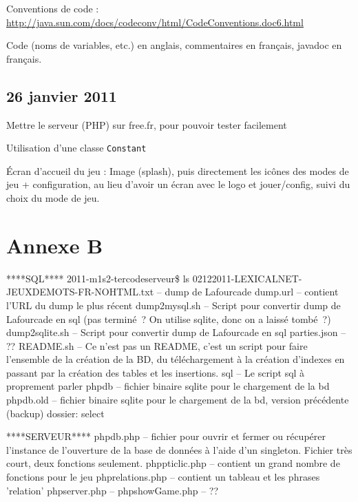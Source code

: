 \documentclass[a4paper,11pt,french]{article}
\begin{document}
Conventions de code : \url{http://java.sun.com/docs/codeconv/html/CodeConventions.doc6.html}

Code (noms de variables, etc.) en anglais, commentaires en français, javadoc en français.

\subsection{26 janvier 2011}
Mettre le serveur (PHP) sur free.fr, pour pouvoir tester facilement

Utilisation d'une classe \verb!Constant!

Écran d'accueil du jeu : Image (splash), puis directement les icônes des modes de jeu + configuration, au lieu d'avoir un écran avec le logo et jouer/config, suivi du choix du mode de jeu.

\section{Annexe B}


****SQL****
2011-m1s2-ter\/code\/serveur\$ ls
02122011-LEXICALNET-JEUXDEMOTS-FR-NOHTML.txt  -- dump de Lafourcade
dump.url -- contient l'URL du dump le plus récent
dump2mysql.sh -- Script pour convertir dump de Lafourcade en sql (pas terminé~? On utilise sqlite, donc on a laissé tombé~?)
dump2sqlite.sh  -- Script pour convertir dump de Lafourcade en sql
parties.json  -- ??
README.sh -- Ce n'est pas un README, c'est un script pour faire l'ensemble de la création de la BD, du téléchargement à la création d'indexes en passant par la création des tables et les insertions.
sql -- Le script sql à proprement parler
php\/db -- fichier binaire sqlite pour le chargement de la bd
php\/db.old -- fichier binaire sqlite pour le chargement de la bd, version précédente (backup)
dossier: select

****SERVEUR****
php\/db.php -- fichier pour ouvrir et fermer ou récupérer l'instance de l'ouverture de la base de données à l'aide d'un singleton. 
		Fichier très court, deux fonctions seulement.
php\/pticlic.php -- contient un grand nombre de fonctions pour le jeu
php\/relations.php -- contient un tableau et les phrases 'relation'
php\/server.php --
php\/showGame.php -- ??
\end{document}
